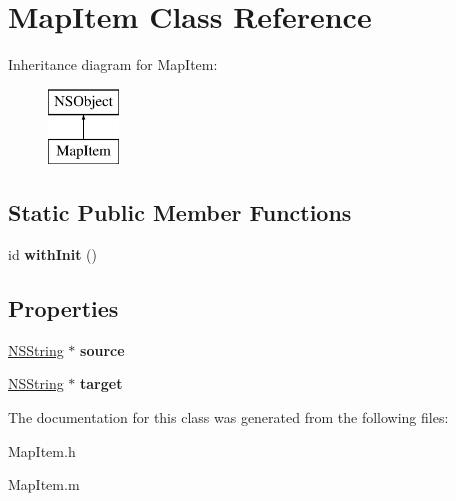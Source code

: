 \hypertarget{interface_map_item}{
\section{\-Map\-Item \-Class \-Reference}
\label{interface_map_item}
}
\-Inheritance diagram for \-Map\-Item\-:\begin{figure}[H]
\begin{center}
\leavevmode
\includegraphics[height=2.000000cm]{interface_map_item}
\end{center}
\end{figure}
\subsection*{\-Static \-Public \-Member \-Functions}
\begin{DoxyCompactItemize}
\item 
\hypertarget{interface_map_item_aaef7500218596c201f8144498a813a2c}{
id {\bfseries with\-Init} ()}
\label{interface_map_item_aaef7500218596c201f8144498a813a2c}

\end{DoxyCompactItemize}
\subsection*{\-Properties}
\begin{DoxyCompactItemize}
\item 
\hypertarget{interface_map_item_ab7b0ad993be44b6bf8485705ac8399b5}{
\hyperlink{class_n_s_string}{\-N\-S\-String} $\ast$ {\bfseries source}}
\label{interface_map_item_ab7b0ad993be44b6bf8485705ac8399b5}

\item 
\hypertarget{interface_map_item_a71584c3e7cbba6e9d17ee819e50ea1e3}{
\hyperlink{class_n_s_string}{\-N\-S\-String} $\ast$ {\bfseries target}}
\label{interface_map_item_a71584c3e7cbba6e9d17ee819e50ea1e3}

\end{DoxyCompactItemize}


\-The documentation for this class was generated from the following files\-:\begin{DoxyCompactItemize}
\item 
\-Map\-Item.\-h\item 
\-Map\-Item.\-m\end{DoxyCompactItemize}
